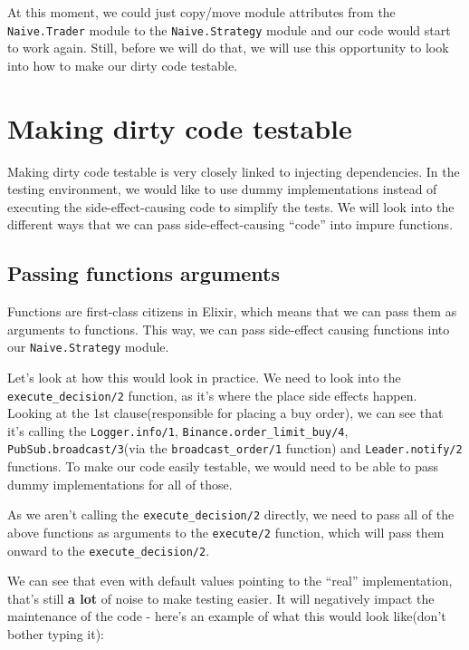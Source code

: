 \documentclass[
  oneside]{book}
\begin{document}
At this moment, we could just copy/move module attributes from the \texttt{Naive.Trader} module to the \texttt{Naive.Strategy} module and our code would start to work again. Still, before we will do that, we will use this opportunity to look into how to make our dirty code testable.

\section{Making dirty code testable}\label{making-dirty-code-testable}

Making dirty code testable is very closely linked to injecting dependencies. In the testing environment, we would like to use dummy implementations instead of executing the side-effect-causing code to simplify the tests. We will look into the different ways that we can pass side-effect-causing ``code'' into impure functions.

\subsection{Passing functions arguments}\label{passing-functions-arguments}

Functions are first-class citizens in Elixir, which means that we can pass them as arguments to functions. This way, we can pass side-effect causing functions into our \texttt{Naive.Strategy} module.

Let's look at how this would look in practice. We need to look into the \texttt{execute\_decision/2} function, as it's where the place side effects happen. Looking at the 1st clause(responsible for placing a buy order), we can see that it's calling the \texttt{Logger.info/1}, \texttt{Binance.order\_limit\_buy/4}, \texttt{PubSub.broadcast/3}(via the \texttt{broadcast\_order/1} function) and \texttt{Leader.notify/2} functions. To make our code easily testable, we would need to be able to pass dummy implementations for all of those.

As we aren't calling the \texttt{execute\_decision/2} directly, we need to pass all of the above functions as arguments to the \texttt{execute/2} function, which will pass them onward to the \texttt{execute\_decision/2}.

We can see that even with default values pointing to the ``real'' implementation, that's still \textbf{a lot} of noise to make testing easier. It will negatively impact the maintenance of the code - here's an example of what this would look like(don't bother typing it):
\end{document}
